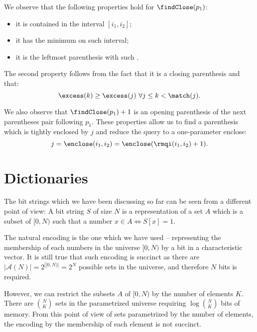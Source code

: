 We observe that the following properties hold for $\findClose(p_1)$:
\begin{itemize}
	\item it is contained in the interval $[i_1, i_2]$;
	\item it has the minimum \excess{} on such interval;
	\item it is the leftmost parenthesis with such \excess{}.
\end{itemize}
The second property follows from the fact that it is a closing parenthesis and that:
$$ \excess(k) \ge \excess(j) \ \forall j \le k < \match(j). $$

We also observe that $\findClose(p_1) + 1$ is an opening parenthesis of the next parentheses pair following $p_1$.
These properties allow us to find a parenthesis which is tightly enclosed by $j$ and reduce the query to a one-parameter enclose:
$$ j = \enclose(i_1, i_2) = \enclose(\rmqi(i_1, i_2) + 1). $$

\section{Dictionaries}

The bit strings which we have been discussing so far can be seen from a different point of view:
A bit string $S$ of size $N$ is a representation of a set $A$ which is a subset of $[0, N)$ such that a number $x \in A \iff S[x] = 1$.

The natural encoding is the one which we have used -- representing the membership of each numbers in the universe $[0, N)$ by a bit in a characteristic vector.
It is still true that such encoding is succinct as there are $| \mathcal{A}(N) | = 2^{|[0, N)|} = 2^N$ possible sets in the universe, and therefore $N$ bits is required.

However, we can restrict the subsets $A$ of $[0, N)$ by the number of elements $K$.
There are ${N \choose K}$ sets in the parametrized universe requiring $\log {N \choose K}$ bits of memory.
From this point of view of sets parametrized by the number of elements, the encoding by the membership of each element is not succinct.

\bigbreak

